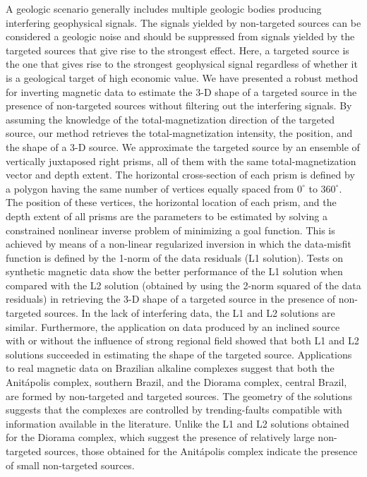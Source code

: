 \begin{foreignabstract}

\noindent A geologic scenario generally includes multiple geologic bodies producing interfering geophysical signals.
The signals yielded by non-targeted sources can be considered a geologic noise and should be suppressed from signals yielded by the targeted sources that give rise to the strongest effect.
Here, a targeted source is the one that gives rise to the strongest geophysical signal regardless of whether it is a geological target of high economic value.
We have presented a robust method for inverting magnetic data to estimate the 3-D shape of a targeted source in the presence of non-targeted sources without filtering out the interfering signals.
By assuming the knowledge of the total-magnetization direction of the targeted source, our method retrieves the total-magnetization intensity, the position, and the shape of a 3-D source.
We approximate the targeted source by an 
ensemble of vertically juxtaposed right prisms, all of them with the same 
total-magnetization vector and depth extent. The horizontal cross-section 
of each prism is defined by a polygon having the same number of vertices 
equally spaced from $0^{\circ}$ to $360^{\circ}$. The position of these 
vertices, the horizontal location of each prism, and the depth extent of all prisms 
are the parameters to be estimated by solving a constrained nonlinear inverse problem 
of minimizing a goal function. 
This is achieved by means of a non-linear regularized inversion in which the data-misfit function is defined by the 1-norm of the data residuals (L1 solution).
Tests on synthetic magnetic data show the better performance of the L1 solution 
when compared with the L2 solution (obtained by using the 2-norm squared of the data residuals) in retrieving the  3-D shape of a targeted source in the presence of non-targeted sources.
In the lack of interfering data, the L1 and L2 solutions are similar.
Furthermore, the application on data produced by an inclined source with or without the influence of strong regional field showed that both L1 and L2 solutions succeeded in estimating the shape of the targeted source.
Applications to real magnetic data on Brazilian alkaline complexes suggest that both the Anitápolis complex, southern Brazil, and the Diorama complex, central Brazil, are formed by non-targeted and targeted sources.
The geometry of the solutions suggests that the complexes are controlled by trending-faults compatible with information available in the literature.
Unlike the L1 and L2 solutions obtained for the Diorama complex, which suggest the presence of relatively large non-targeted sources, those obtained for the Anitápolis complex indicate the presence of small non-targeted sources.

\end{foreignabstract}

